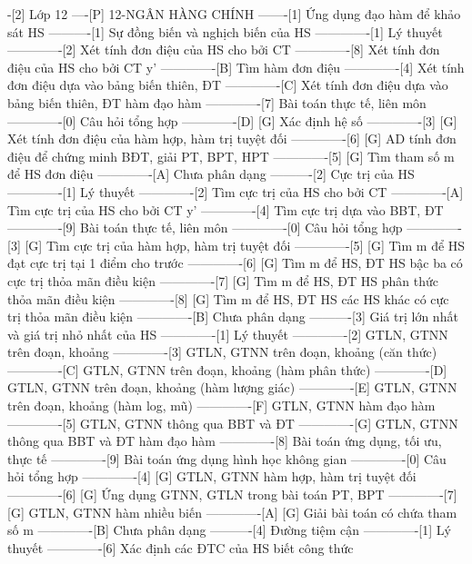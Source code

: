 -[2] Lớp 12
----[P] 12-NGÂN HÀNG CHÍNH
-------[1] Ứng dụng đạo hàm để khảo sát HS
----------[1] Sự đồng biến và nghịch biến của HS
-------------[1] Lý thuyết
-------------[2] Xét tính đơn điệu của HS cho bởi CT
-------------[8] Xét tính đơn điệu của HS cho bởi CT y'
-------------[B] Tìm hàm đơn điệu 
-------------[4] Xét tính đơn điệu dựa vào bảng biến thiên, ĐT
-------------[C] Xét tính đơn điệu dựa vào bảng biến thiên, ĐT hàm đạo hàm
-------------[7] Bài toán thực tế, liên môn
-------------[0] Câu hỏi tổng hợp
-------------[D] [G] Xác định hệ số
-------------[3] [G] Xét tính đơn điệu của hàm hợp, hàm trị tuyệt đối
-------------[6] [G] AD tính đơn điệu để chứng minh BĐT, giải PT, BPT, HPT
-------------[5] [G] Tìm tham số m để HS đơn điệu
-------------[A] Chưa phân dạng
----------[2] Cực trị của HS
-------------[1] Lý thuyết
-------------[2] Tìm cực trị của HS cho bởi CT
-------------[A] Tìm cực trị của HS cho bởi CT y'
-------------[4] Tìm cực trị dựa vào BBT, ĐT
-------------[9] Bài toán thực tế, liên môn
-------------[0] Câu hỏi tổng hợp
-------------[3] [G] Tìm cực trị của hàm hợp, hàm trị tuyệt đối
-------------[5] [G] Tìm m để HS đạt cực trị tại 1 điểm cho trước
-------------[6] [G] Tìm m để HS, ĐT HS bậc ba có cực trị thỏa mãn điều kiện
-------------[7] [G] Tìm m để HS, ĐT HS phân thức thỏa mãn điều kiện
-------------[8] [G] Tìm m để HS, ĐT HS các HS khác có cực trị thỏa mãn điều kiện
-------------[B] Chưa phân dạng
----------[3] Giá trị lớn nhất và giá trị nhỏ nhất của HS
-------------[1] Lý thuyết
-------------[2] GTLN, GTNN trên đoạn, khoảng
-------------[3] GTLN, GTNN trên đoạn, khoảng (căn thức)
-------------[C] GTLN, GTNN trên đoạn, khoảng (hàm phân thức)
-------------[D] GTLN, GTNN trên đoạn, khoảng (hàm lượng giác)
-------------[E] GTLN, GTNN trên đoạn, khoảng (hàm log, mũ)
-------------[F] GTLN, GTNN hàm đạo hàm
-------------[5] GTLN, GTNN thông qua BBT và ĐT
-------------[G] GTLN, GTNN thông qua BBT và ĐT hàm đạo hàm
-------------[8] Bài toán ứng dụng, tối ưu, thực tế
-------------[9] Bài toán ứng dụng hình học không gian
-------------[0] Câu hỏi tổng hợp
-------------[4] [G] GTLN, GTNN hàm hợp, hàm trị tuyệt đối
-------------[6] [G] Ứng dụng GTNN, GTLN trong bài toán PT, BPT 
-------------[7] [G] GTLN, GTNN hàm nhiều biến
-------------[A] [G] Giải bài toán có chứa tham số m
-------------[B] Chưa phân dạng
----------[4] Đường tiệm cận
-------------[1] Lý thuyết
-------------[6] Xác định các ĐTC của HS biết công thức
